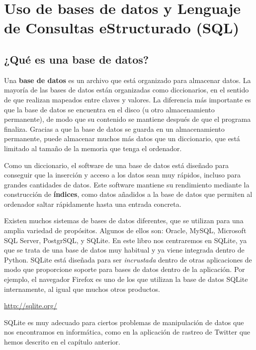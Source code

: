 
\chapter{Uso de bases de datos y Lenguaje de Consultas eStructurado (SQL)}

\section{¿Qué es una base de datos?}

Una {\bf base de datos} es un archivo que está organizado para almacenar datos.
La mayoría de las bases de datos están organizadas como diccionarios, en el sentido
de que realizan mapeados entre claves y valores. La diferencia más importante
es que la base de datos se encuentra en el disco (u otro almacenamiento permanente),
de modo que su contenido se mantiene después de que el programa finaliza. Gracias a que la base de
datos se guarda en un almacenamiento permanente, puede almacenar muchos más datos que
un diccionario, que está limitado al tamaño de la memoria
que tenga el ordenador.

Como un diccionario, el software de una base de datos está diseñado para conseguir que
la inserción y acceso a los datos sean muy rápidos, incluso para grandes
cantidades de datos. Este software mantiene su rendimiento mediante la
construcción de {\bf índices}, como datos añadidos a la base de datos
que permiten al ordenador saltar rápidamente hasta una entrada
concreta.

Existen muchos sistemas de bases de datos diferentes, que se utilizan para una
amplia variedad de propósitos. Algunos de ellos son: Oracle, MySQL, Microsoft SQL Server,
PostgrSQL, y SQLite. En este libro nos centraremos en SQLite, ya que
se trata de una base de datos muy habitual y ya viene integrada dentro de Python.
SQLite está diseñada para ser \emph{incrustada} dentro de otras aplicaciones
de modo que proporcione soporte para bases de datos dentro de la aplicación. Por ejemplo,
el navegador Firefox es uno de los que utilizan la base de datos SQLite internamente,
al igual que muchos otros productos.

\url{http://sqlite.org/}

SQLite es muy adecuado para ciertos problemas de manipulación de datos que nos
encontramos en informática, como en la aplicación de rastreo de Twitter que
hemos descrito en el capítulo anterior.

